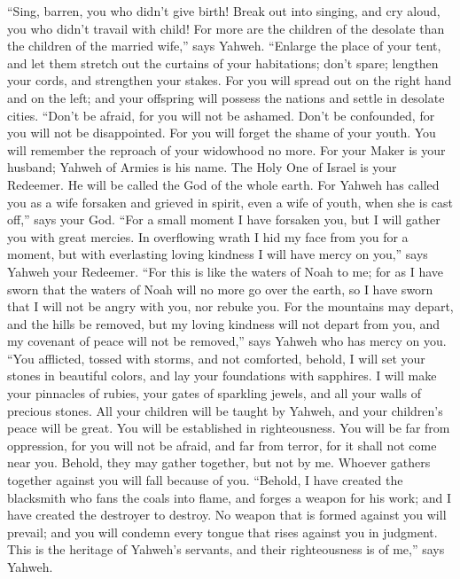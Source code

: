  ``Sing, barren, you who didn't give birth! Break out into
singing, and cry aloud, you who didn't travail with child! For more are
the children of the desolate than the children of the married wife,''
says Yahweh.  ``Enlarge the place of your tent, and let them
stretch out the curtains of your habitations; don't spare; lengthen your
cords, and strengthen your stakes.  For you will spread out
on the right hand and on the left; and your offspring will possess the
nations and settle in desolate cities.  ``Don't be afraid,
for you will not be ashamed. Don't be confounded, for you will not be
disappointed. For you will forget the shame of your youth. You will
remember the reproach of your widowhood no more.  For your
Maker is your husband; Yahweh of Armies is his name. The Holy One of
Israel is your Redeemer. He will be called the God of the whole earth.
 For Yahweh has called you as a wife forsaken and grieved in
spirit, even a wife of youth, when she is cast off,'' says your God.
 ``For a small moment I have forsaken you, but I will gather
you with great mercies.  In overflowing wrath I hid my face
from you for a moment, but with everlasting loving kindness I will have
mercy on you,'' says Yahweh your Redeemer.  ``For this is
like the waters of Noah to me; for as I have sworn that the waters of
Noah will no more go over the earth, so I have sworn that I will not be
angry with you, nor rebuke you.  For the mountains may
depart, and the hills be removed, but my loving kindness will not depart
from you, and my covenant of peace will not be removed,'' says Yahweh
who has mercy on you.  ``You afflicted, tossed with storms,
and not comforted, behold, I will set your stones in beautiful colors,
and lay your foundations with sapphires.  I will make your
pinnacles of rubies, your gates of sparkling jewels, and all your walls
of precious stones.  All your children will be taught by
Yahweh, and your children's peace will be great.  You will
be established in righteousness. You will be far from oppression, for
you will not be afraid, and far from terror, for it shall not come near
you.  Behold, they may gather together, but not by me.
Whoever gathers together against you will fall because of you.
 ``Behold, I have created the blacksmith who fans the coals
into flame, and forges a weapon for his work; and I have created the
destroyer to destroy.  No weapon that is formed against you
will prevail; and you will condemn every tongue that rises against you
in judgment. This is the heritage of Yahweh's servants, and their
righteousness is of me,'' says Yahweh.

